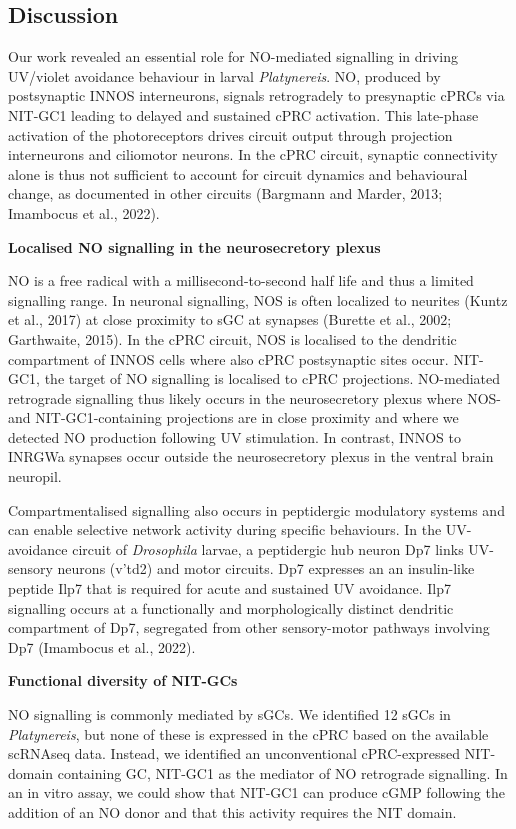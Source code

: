 \documentclass[
  10pt,
  onecolumn]{article}
\begin{document}
\hypertarget{discussion}{%
\subsection{Discussion}\label{discussion}}

Our work revealed an essential role for NO-mediated signalling in
driving UV/violet avoidance behaviour in larval \emph{Platynereis}. NO,
produced by postsynaptic INNOS interneurons, signals retrogradely to
presynaptic cPRCs via NIT-GC1 leading to delayed and sustained cPRC
activation. This late-phase activation of the photoreceptors drives
circuit output through projection interneurons and ciliomotor neurons.
In the cPRC circuit, synaptic connectivity alone is thus not sufficient
to account for circuit dynamics and behavioural change, as documented in
other circuits (Bargmann and Marder, 2013; Imambocus et al., 2022).

\textbf{Localised NO signalling in the neurosecretory plexus}

NO is a free radical with a millisecond-to-second half life and thus a
limited signalling range. In neuronal signalling, NOS is often localized
to neurites (Kuntz et al., 2017) at close proximity to sGC at synapses
(Burette et al., 2002; Garthwaite, 2015). In the cPRC circuit, NOS is
localised to the dendritic compartment of INNOS cells where also cPRC
postsynaptic sites occur. NIT-GC1, the target of NO signalling is
localised to cPRC projections. NO-mediated retrograde signalling thus
likely occurs in the neurosecretory plexus where NOS- and
NIT-GC1-containing projections are in close proximity and where we
detected NO production following UV stimulation. In contrast, INNOS to
INRGWa synapses occur outside the neurosecretory plexus in the ventral
brain neuropil.

Compartmentalised signalling also occurs in peptidergic modulatory
systems and can enable selective network activity during specific
behaviours. In the UV-avoidance circuit of \emph{Drosophila} larvae, a
peptidergic hub neuron Dp7 links UV-sensory neurons (v'td2) and motor
circuits. Dp7 expresses an an insulin-like peptide Ilp7 that is required
for acute and sustained UV avoidance. Ilp7 signalling occurs at a
functionally and morphologically distinct dendritic compartment of Dp7,
segregated from other sensory-motor pathways involving Dp7 (Imambocus et
al., 2022).

\textbf{Functional diversity of NIT-GCs}

NO signalling is commonly mediated by sGCs. We identified 12 sGCs in
\emph{Platynereis}, but none of these is expressed in the cPRC based on
the available scRNAseq data. Instead, we identified an unconventional
cPRC-expressed NIT-domain containing GC, NIT-GC1 as the mediator of NO
retrograde signalling. In an in vitro assay, we could show that NIT-GC1
can produce cGMP following the addition of an NO donor and that this
activity requires the NIT domain.
\end{document}
